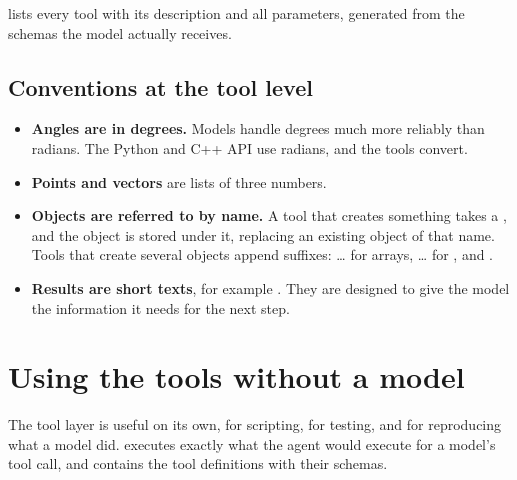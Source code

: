  lists every tool with its description and all parameters, generated from
the schemas the model actually receives.

\subsection{Conventions at the tool level}

\begin{itemize}
  \item \textbf{Angles are in degrees.} Models handle degrees much more reliably than radians.
    The Python and C++ API use radians, and the tools convert.
  \item \textbf{Points and vectors} are lists of three numbers.
  \item \textbf{Objects are referred to by name.} A tool that creates something takes a
    , and the object is stored under it, replacing an existing object of that name.
    Tools that create several objects append suffixes:  \dots{} for arrays,
     \dots{} for ,  and .
  \item \textbf{Results are short texts}, for example
    . They are designed to give the model the
    information it needs for the next step.
\end{itemize}

\section{Using the tools without a model}

The tool layer is useful on its own, for scripting, for testing, and for reproducing what a
model did.  executes exactly what the agent would
execute for a model's tool call, and  contains the tool definitions with their
schemas.


